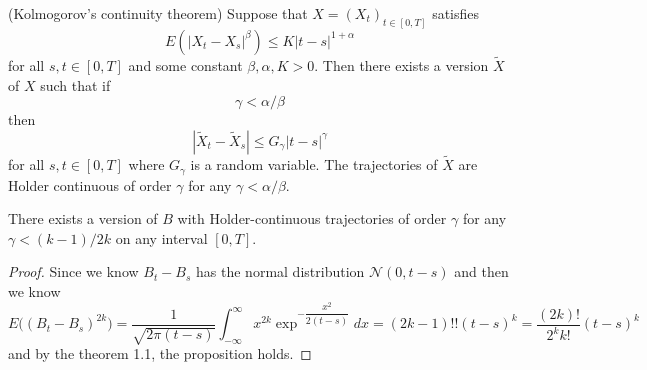 \documentclass[lang=en, color=blue, ]{elegantbook}
\begin{document}
\begin{theorem}
    (Kolmogorov's continuity theorem) Suppose that $X= (X_t)_{t\in[0,T]}$ satisfies
    \[E(|X_t-X_s|^{\beta}) \leq K|t-s|^{1+\alpha}\]
    for all $s,t\in[0,T]$ and some constant $\beta,\alpha,K>0$. Then there exists a version $\tilde{X}$ of $X$ such that if
    \[\gamma < \alpha/\beta\]
    then
    \[|\tilde{X}_{t}-\tilde{X}_s| \leq G_{\gamma}|t-s|^{\gamma}\]
    for all $s,t\in[0,T]$ where $G_{\gamma}$ is a random variable. The trajectories of $\tilde{X}$ are Holder continuous of order $\gamma$ for any $\gamma < \alpha/\beta$.
\end{theorem}

\begin{proposition}
    There exists a version of $B$ with Holder-continuous trajectories of order $\gamma$ for any $\gamma < (k-1)/2k$ on any interval $[0,T]$.
\end{proposition}
\begin{proof}\par
    Since we know $B_t-B_s$ has the normal distribution $\mathcal{N}(0,t-s)$ and then we know
    \[
    E\Big((B_t-B_s)^{2k}\Big) = \dfrac{1}{\sqrt{2\pi(t-s)}}\int_{-\infty}^{\infty}x^{2k} \exp^{-\dfrac{x^2}{2(t-s)}} dx = (2k-1)!!(t-s)^k = \dfrac{(2k)!}{2^kk!}(t-s)^k
    \]
    and by the theorem 1.1, the proposition holds.
\end{proof}
\end{document}
